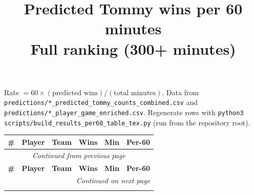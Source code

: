 \documentclass[11pt]{article}
\title{Predicted Tommy wins per 60 minutes\\{\large Full ranking (300+ minutes)}}
\author{}
\date{}
\begin{document}
\maketitle

\noindent
Rate $= 60 \times (\text{predicted wins}) / (\text{total minutes})$.
Data from \texttt{predictions/*\_predicted\_tommy\_counts\_combined.csv} and
\texttt{predictions/*\_player\_game\_enriched.csv}. Regenerate rows with
\texttt{python3 scripts/build\_results\_per60\_table\_tex.py} (run from the repository root).

\vspace{1em}

\footnotesize
\setlength{\tabcolsep}{4pt}
\begin{longtable}{@{}r l l r r r@{}}
    \toprule
    \textbf{\#} & \textbf{Player} & \textbf{Team} & \textbf{Wins} & \textbf{Min} & \textbf{Per-60} \\
    \endfirsthead
    \multicolumn{6}{c}{\textit{Continued from previous page}} \\
    \toprule
    \textbf{\#} & \textbf{Player} & \textbf{Team} & \textbf{Wins} & \textbf{Min} & \textbf{Per-60} \\
    \endhead
    \midrule
    \multicolumn{6}{r}{\textit{Continued on next page}} \\
    \endfoot
    \bottomrule
    \endlastfoot
    
\end{longtable}
\end{document}

